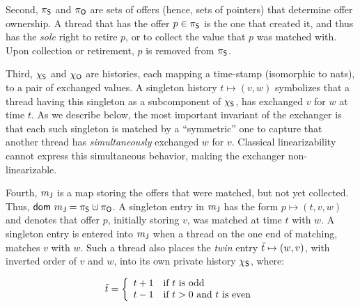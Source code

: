 Second, $\pi_{\mathsf{S}}$ and $\pi_{\mathsf{O}}$ are sets of offers (hence, sets of
pointers) that determine offer ownership. A thread that has the offer
$p \in \pi_{\mathsf{S}}$ is the one that created it, and thus has the
\emph{sole} right to retire $p$, or to collect the value that $p$ was
matched with. Upon collection or retirement, $p$ is removed from
$\pi_{\mathsf{S}}$.


Third, $\chi_{\mathsf{S}}$ and $\chi_{\mathsf{O}}$ are histories, each mapping a time-stamp
(isomorphic to nats), to a pair of exchanged values. A singleton
history $t \mapsto (v, w)$ symbolizes that a thread having this
singleton as a subcomponent of $\chi_{\mathsf{S}}$, has exchanged $v$ for $w$ at
time $t$.
%
%
As we describe below, the most important invariant of the exchanger is
that each such singleton is matched by a ``symmetric'' one to capture
that another thread has \emph{simultaneously} exchanged $w$ for
$v$. Classical linearizability cannot express this simultaneous
behavior, making the exchanger non-linearizable.

Fourth, ${m_{\mathsf{J}}}$ is a map storing the offers that were matched, but
not yet collected. Thus, $\mathsf{dom}\ \pending = \perms \hunion
\permo$. A singleton entry in ${m_{\mathsf{J}}}$ has the form $p \mapsto (t,
v, w)$ and denotes that offer $p$, initially storing $v$, was matched
at time $t$ with $w$. A singleton entry is entered into ${m_{\mathsf{J}}}$
when a thread on the one end of matching, matches $v$ with $w$. Such a
thread also places the \emph{twin} entry $\bar{t} \mapsto (w, v)$,
with inverted order of $v$ and $w$, into its own private history
$\chi_{\mathsf{S}}$, where:

\[
\begin{array}{c}
\vspace{-5pt}
\twin{t} = \left\{%
\begin{array}{ll}
t+1 & \mbox{if $t$ is odd}\\
t-1 & \mbox{if $t > 0$ and $t$ is even}
\end{array}\right.  
\end{array}
\]

